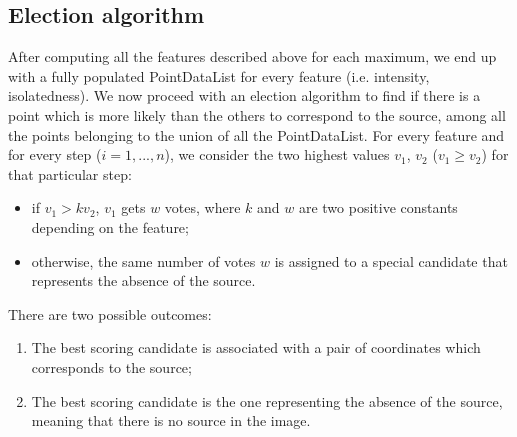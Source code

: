 \documentclass[a4paper,12pt,oneside]{book}
\begin{document}
\begin{onehalfspace}
	\section{Election algorithm} \label{election_algorithm}
	After computing all the features described above for each maximum, we end up with a fully populated PointDataList for every feature (i.e. intensity, isolatedness).
	We now proceed with an election algorithm to find if there is a point which is more likely than the others to	correspond to the source, among all the points belonging to the union of all the PointDataList. For every feature and for every step ($i=1, ..., n$), we consider the two highest values $v_1$, $v_2$ ($v_1 \geq v_2$) for that particular step:
	\begin{itemize}
	    \setlength\itemsep{0em}
    	\item if $v_1 > kv_2$, $v_1$ gets $w$ votes, where $k$ and $w$ are two positive constants depending on the feature;
    	\item otherwise, the same number of votes $w$ is assigned to a special candidate that represents the absence of the source.
	\end{itemize}
	There are two possible outcomes:
	\begin{enumerate}[itemsep=0em]
    	\item The best scoring candidate is associated with a pair of coordinates which corresponds to the source;
    	\item The best scoring candidate is the one representing the absence of the source, meaning that there is no source in the image.
	\end{enumerate}
	

\end{onehalfspace}
\end{document}

